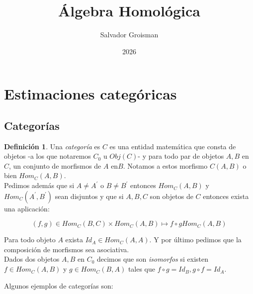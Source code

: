 \documentclass{article}
\title{Álgebra Homológica}
\author{Salvador Groisman}
\date{2026}
\theoremstyle{plain}
\theoremstyle{definition}
\newtheorem{definition}[theorem]{Definición}
\theoremstyle{remark}
\begin{document}
\pagestyle{fancy}
\fancyhf{} 
\fancyfoot[C]{\thepage}

\maketitle

\newpage

\tableofcontents

\newpage

\section{Estimaciones categóricas}

\subsection{Categorías}

\begin{definition}
    Una \textit{categoría} es $C$ es una entidad matemática que consta de objetos -a los que notaremos $C_0$ u $Obj(C)$- y para todo par de objetos $A,B$ en $C$, un conjunto de morfismos de $A$ en$B$. Notamos a estos morfismo $C(A,B)$ o bien $Hom_C(A,B)$. \\

    Pedimos además que si $A\neq A^\prime$ o $B \neq B^\prime$ entonces $Hom_C(A,B)$ y $Hom_C(A^\prime,B^\prime)$ sean disjuntos y que si $A,B,C$ son objetos de $C$ entonces exista una aplicación:

    \begin{equation*}
        (f,g) \in Hom_C(B,C) \times Hom_C(A,B) \mapsto f \circ g Hom_C(A,B)
    \end{equation*} 

    Para todo objeto $A$ exista $Id_A \in Hom_C(A,A)$. Y por último pedimos que la composición de morfismos sea asociativa. \\

    Dados dos objetos $A,B$ en $C_0$ decimos que son \textit{isomorfos} si existen $f \in Hom_C(A,B)$ y $g \in Hom_C(B,A)$ tales que $f \circ g = Id_B, g \circ f = Id_A$.
\end{definition}

Algunos ejemplos de categorías son:
\end{document}
